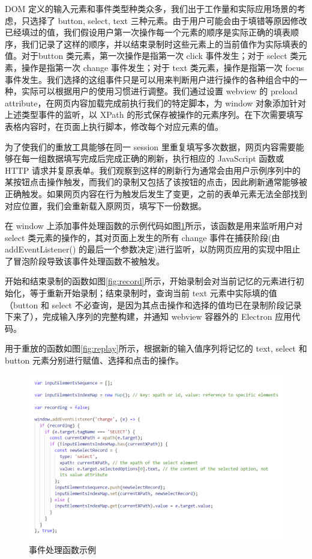 \documentclass[design, pageheader]{njubachelor}
\begin{document}
DOM 定义的输入元素和事件类型种类众多，我们出于工作量和实际应用场景的考虑，只选择了 
button, select, text 三种元素。由于用户可能会由于填错等原因修改已经填过的值，我们假设用户第一次操作每一个元素的顺序是实际正确的填表顺序，我们记录了这样的顺序，并以结束录制时这些元素上的当前值作为实际填表的值。对于button 类元素，第一次操作是指第一次 click 事件发生；对于 select 类元素，操作是指第一次 change 事件发生；对于 text 类元素，操作是指第一次 focus 事件发生。我们选择的这组事件只是可以用来判断用户进行操作的各种组合中的一种，实际可以根据用户的使用习惯进行调整。我们通过设置 webview 的 preload attribute，在网页内容加载完成前执行我们的特定脚本，为 window 对象添加针对上述类型事件的监听，以 XPath 的形式保存被操作的元素序列。在下次需要填写表格内容时，在页面上执行脚本，修改每个对应元素的值。

为了使我们的重放工具能够在同一 session 里重复填写多次数据，网页内容需要能够在每一组数据填写完成后完成正确的刷新，执行相应的 JavaScript 函数或 HTTP 请求并复原表单。我们观察到这样的刷新行为通常会由用户示例序列中的某按钮点击操作触发，而我们的录制又包括了该按钮的点击，因此刷新通常能够被正确触发。如果网页内容在行为触发后发生了变更，之前的表单元素无法全部找到对应位置，我们会重新载入原网页，填写下一份数据。

在 window 上添加事件处理函数的示例代码如图\ref{fig:listener}所示，该函数是用来监听用户对 select 类元素的操作的，其对页面上发生的所有 change 事件在捕获阶段(由 addEventListener() 的最后一个参数决定)进行监听，以防网页应用的实现中阻止了冒泡阶段导致该事件处理函数不被触发。

开始和结束录制的函数如图\ref{fig:record}所示，开始录制会对当前记忆的元素进行初始化，等于重新开始录制；结束录制时，查询当前 text 元素中实际填的值（button 和 select 不必查询，是因为其点击操作和选择的值均已在录制阶段记录下来了），完成输入序列的完整构建，并通知 webview 容器外的 Electron 应用代码。

用于重放的函数如图\ref{fig:replay}所示，根据新的输入值序列将记忆的 text, select 和 button 元素分别进行赋值、选择和点击的操作。
\begin{figure}
    \centering
    \includegraphics[width=15cm,keepaspectratio]{figures/listener.png}
    \caption{事件处理函数示例}
    \label{fig:listener}
\end{figure}
\end{document}
